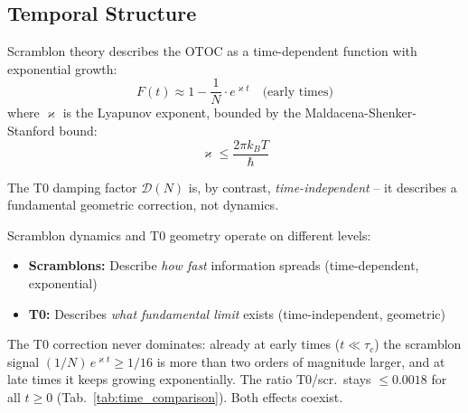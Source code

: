 \subsection{Temporal Structure}

Scramblon theory describes the OTOC as a time-dependent function with exponential growth:
\begin{equation}
	F(t) \approx 1 - \frac{1}{N} \cdot e^{\varkappa t} \quad \text{(early times)}
	\label{eq:otoc_scrambling}
\end{equation}
where $\varkappa$ is the Lyapunov exponent, bounded by the Maldacena-Shenker-Stanford bound:
\begin{equation}
	\varkappa \leq \frac{2\pi k_B T}{\hbar}
\end{equation}

The T0 damping factor $\mathcal{D}(N)$ is, by contrast, \emph{time-independent} -- it describes a fundamental geometric correction, not dynamics.

\begin{table}[h]
	\centering
	\caption{Time comparison: scramblon OTOC decay vs.\ static T0 correction ($N=16$, $\varkappa \cdot \tau_c \approx 1$)}
	\label{tab:time_comparison}
\end{table}

\begin{remark}[Complementarity]
	Scramblon dynamics and T0 geometry operate on different levels:
	\begin{itemize}
		\item \textbf{Scramblons:} Describe \emph{how fast} information spreads (time-dependent, exponential)
		\item \textbf{T0:} Describes \emph{what fundamental limit} exists (time-independent, geometric)
	\end{itemize}
	The T0 correction never dominates: already at early times ($t \ll \tau_c$) the scramblon signal $(1/N)\,e^{\varkappa t} \geq 1/16$ is more than two orders of magnitude larger, and at late times it keeps growing exponentially. The ratio T0/scr.\ stays $\leq 0.0018$ for all $t \geq 0$ (Tab.~\ref{tab:time_comparison}). Both effects coexist.
\end{remark}

